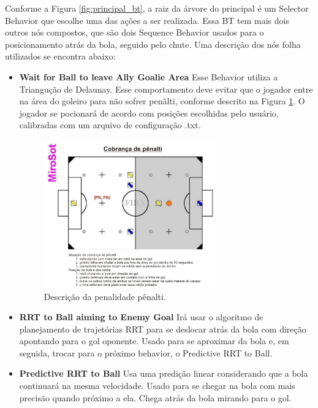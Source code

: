 \documentclass[conference]{IEEEtran}
\begin{document}
Conforme a Figura \ref{fig:principal_bt}, a raiz da árvore do principal é um Selector Behavior que escolhe uma das ações a ser realizada. Essa BT tem mais dois outros nós compostos, que são dois Sequence Behavior usados para o posicionamento atrás da bola, seguido pelo chute. Uma descrição dos nós folha utilizados se encontra abaixo:

\begin{itemize}

\item \textbf{Wait for Ball to leave Ally Goalie Area} Esse Behavior utiliza a Triangução de Delaunay. Esse comportamento deve evitar que o jogador entre na área do goleiro para não sofrer penâlti, conforme descrito na Figura \ref{fig:penalty}. O jogador se pocionará de acordo com posições escolhidas pelo usuário, calibradas com um arquivo de configuração .txt.

\begin{figure}[H]
	\centering
	\includegraphics[width=0.7\textwidth]{figures/campo_penalty.png}
   \caption{Descrição da penalidade pênalti.} \label{fig:penalty}
\end{figure}

\item \textbf{RRT to Ball aiming to Enemy Goal} Irá usar o algoritmo de planejamento de trajetórias RRT para se deslocar atrás da bola com direção apontando para o gol oponente. Usado para se aproximar da bola e, em seguida, trocar para o próximo behavior, o Predictive RRT to Ball.

\item \textbf{Predictive RRT to Ball} Usa uma predição linear considerando que a bola continuará na mesma velocidade. Usado para se chegar na bola com mais precisão quando próximo a ela. Chega atrás da bola mirando para o gol.


\end{itemize}
\end{document}
